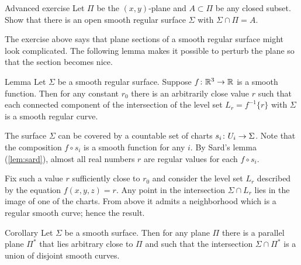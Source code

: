 \begin{thm}{Advanced exercise}\label{ex:plane-section}
Let $\Pi$ be the $(x,y)$-plane and $A \subset \Pi$ be any closed subset. Show that there is an open smooth regular surface $\Sigma$ with $\Sigma \cap \Pi = A$.
\end{thm}

The exercise above says that plane sections of a smooth regular surface might look complicated.
The following lemma makes it possible to perturb the plane so that the section becomes nice.

\begin{thm}{Lemma}\label{lem:reg-section}
Let $\Sigma$ be a smooth regular surface.
Suppose $f\:\RR^3\z\to\RR$ is a smooth function.
Then for any constant $r_0$ there is an arbitrarily close value $r$ such that 
each connected component of the intersection of the level set $L_{r}=f^{-1}\{r\}$ with
$\Sigma$ is a smooth regular curve.
\end{thm}

The surface $\Sigma$ can be covered by a countable set of charts $s_i\:U_i\z\to \Sigma$.
Note that the composition $f\circ s_i$ is a smooth function for any $i$.
By Sard's lemma (\ref{lem:sard}), almost all real numbers $r$ are regular values for each $f\circ s_i$.

Fix such a value $r$ sufficiently close to $r_0$ and consider the level set $L_r$ described by the equation $f(x,y,z)=r$.
Any point in the intersection $\Sigma\cap L_r$ lies in the image of one of the charts.
From above it admits a neighborhood which is a regular smooth curve;
hence the result.\qeds

\begin{thm}{Corollary}
Let $\Sigma$ be a smooth surface.
Then for any plane $\Pi$ there is a parallel plane $\Pi^{*}$ that lies arbitrary close to $\Pi$ and such that the intersection $\Sigma\cap\Pi^{*}$ is a union of disjoint smooth curves.
\end{thm}



